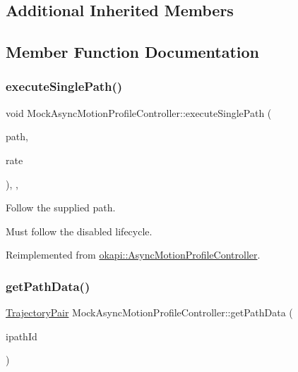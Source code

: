 \subsection*{Additional Inherited Members}


\subsection{Member Function Documentation}
\mbox{\label{classMockAsyncMotionProfileController_ac23cb420367b489e1f79e3989c77262e}} 
\subsubsection{\texorpdfstring{executeSinglePath()}{executeSinglePath()}}
{\footnotesize\ttfamily void Mock\+Async\+Motion\+Profile\+Controller\+::execute\+Single\+Path (\begin{DoxyParamCaption}\item[{const \mbox{\hyperlink{structokapi_1_1AsyncMotionProfileController_1_1TrajectoryPair}{Trajectory\+Pair}} \&}]{path,  }\item[{std\+::unique\+\_\+ptr$<$ \mbox{\hyperlink{classokapi_1_1AbstractRate}{Abstract\+Rate}} $>$}]{rate }\end{DoxyParamCaption})\hspace{0.3cm}{\ttfamily [inline]}, {\ttfamily [override]}, {\ttfamily [virtual]}}



Follow the supplied path. 

Must follow the disabled lifecycle. 

Reimplemented from \mbox{\hyperlink{classokapi_1_1AsyncMotionProfileController_abbc724e5856bff8879cb834bfc3cc6c3}{okapi\+::\+Async\+Motion\+Profile\+Controller}}.

\mbox{\label{classMockAsyncMotionProfileController_a1b0d76d8f5eab21d5eaced43d678939b}} 
\subsubsection{\texorpdfstring{getPathData()}{getPathData()}}
{\footnotesize\ttfamily \mbox{\hyperlink{structokapi_1_1AsyncMotionProfileController_1_1TrajectoryPair}{Trajectory\+Pair}} Mock\+Async\+Motion\+Profile\+Controller\+::get\+Path\+Data (\begin{DoxyParamCaption}\item[{std\+::string}]{ipath\+Id }\end{DoxyParamCaption})\hspace{0.3cm}{\ttfamily [inline]}}



